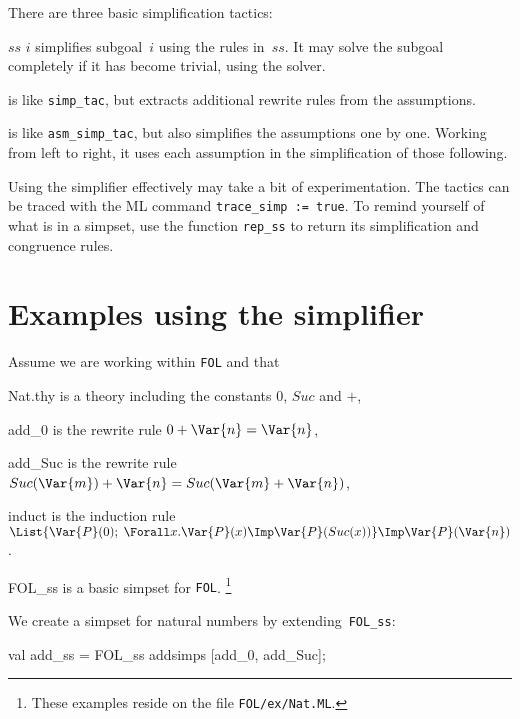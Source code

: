 There are three basic simplification tactics:
\begin{ttdescription}
\item[\ttindexbold{simp_tac} $ss$ $i$] simplifies subgoal~$i$ using the rules
  in~$ss$.  It may solve the subgoal completely if it has become trivial,
  using the solver.
  
\item[\ttindexbold{asm_simp_tac}]
  is like \verb$simp_tac$, but extracts additional rewrite rules from the
  assumptions.

\item[\ttindexbold{asm_full_simp_tac}] 
  is like \verb$asm_simp_tac$, but also simplifies the assumptions one by
  one.  Working from left to right, it uses each assumption in the
  simplification of those following.
\end{ttdescription}
Using the simplifier effectively may take a bit of experimentation.  The
tactics can be traced with the ML command \verb$trace_simp := true$.  To
remind yourself of what is in a simpset, use the function \verb$rep_ss$ to
return its simplification and congruence rules.

\section{Examples using the simplifier}
Assume we are working within {\tt FOL} and that
\begin{ttdescription}
\item[Nat.thy] 
  is a theory including the constants $0$, $Suc$ and $+$,
\item[add_0]
  is the rewrite rule $0+\Var{n} = \Var{n}$,
\item[add_Suc]
  is the rewrite rule $Suc(\Var{m})+\Var{n} = Suc(\Var{m}+\Var{n})$,
\item[induct]
  is the induction rule $\List{\Var{P}(0);\; \Forall x. \Var{P}(x)\Imp
    \Var{P}(Suc(x))} \Imp \Var{P}(\Var{n})$.
\item[FOL_ss]
  is a basic simpset for {\tt FOL}.%
\footnote{These examples reside on the file {\tt FOL/ex/Nat.ML}.} 
\end{ttdescription}

We create a simpset for natural numbers by extending~{\tt FOL_ss}:
\begin{ttbox}
val add_ss = FOL_ss addsimps [add_0, add_Suc];
\end{ttbox}


